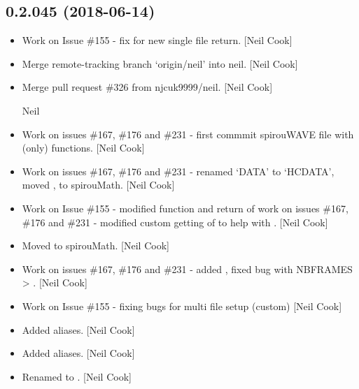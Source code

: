 \documentclass[a4paper,10pt,english]{report}
\begin{document}
\subsection{0.2.045 (2018-06-14)}
\label{\detokenize{misc/changelog:id420}}\begin{itemize}
\item {} 
Work on Issue \#155 - fix for new single file return. {[}Neil Cook{]}

\item {} 
Merge remote-tracking branch ‘origin/neil’ into neil. {[}Neil Cook{]}

\item {} 
Merge pull request \#326 from njcuk9999/neil. {[}Neil Cook{]}

Neil

\item {} 
Work on issues \#167, \#176 and \#231 - first commmit spirouWAVE file
with  (only) functions. {[}Neil Cook{]}

\item {} 
Work on issues \#167, \#176 and \#231 - renamed ‘DATA’ to ‘HCDATA’, moved
,  to spirouMath. {[}Neil Cook{]}

\item {} 
Work on Issue \#155 - modified  function and return of
 work on issues \#167, \#176 and \#231 - modified custom
getting of  to help with . {[}Neil Cook{]}

\item {} 
Moved  to spirouMath. {[}Neil Cook{]}

\item {} 
Work on issues \#167, \#176 and \#231 - added , fixed bug with
NBFRAMES  \textendash{}\textgreater{} . {[}Neil Cook{]}

\item {} 
Work on Issue \#155 - fixing bugs for multi file setup (custom) {[}Neil
Cook{]}

\item {} 
Added aliases. {[}Neil Cook{]}

\item {} 
Added aliases. {[}Neil Cook{]}

\item {} 
Renamed  to . {[}Neil Cook{]}


\end{itemize}
\end{document}

